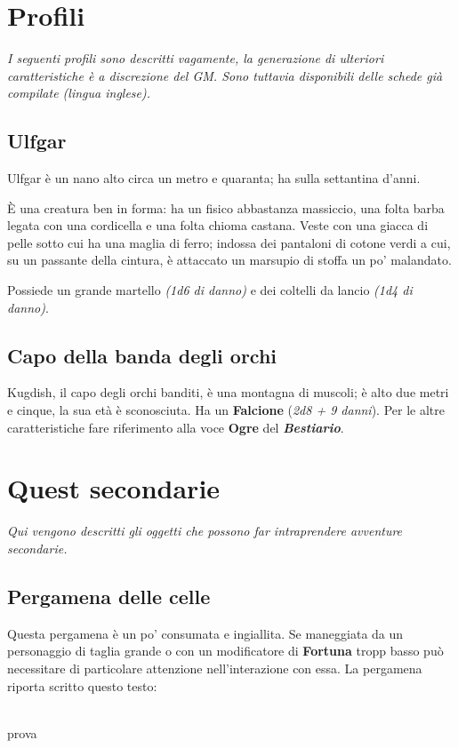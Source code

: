  		\section{Profili}
 			\textit{I seguenti profili sono descritti vagamente, la generazione di ulteriori caratteristiche è a discrezione del GM. Sono tuttavia disponibili delle schede già compilate (lingua inglese).}
 			\subsection{Ulfgar}
 				Ulfgar è un nano alto circa un metro e quaranta; ha sulla settantina d'anni.\par
 				È una creatura ben in forma: ha un fisico abbastanza massiccio, una folta barba legata con una cordicella e una folta chioma castana. Veste con una giacca di pelle sotto cui ha una maglia di ferro; indossa dei pantaloni di cotone verdi a cui, su un passante della cintura, è attaccato un marsupio di stoffa un po' malandato.\par
 				Possiede un grande martello \emph{(1d6 di danno)} e dei coltelli da lancio \emph{(1d4 di danno)}.\par
 			\subsection{Capo della banda degli orchi}
 				Kugdish, il capo degli orchi banditi, è una montagna di muscoli; è alto due metri e cinque, la sua età è sconosciuta. Ha un \textbf{Falcione} (\textit{2d8 + 9 danni}). Per le altre caratteristiche fare riferimento alla voce \textbf{Ogre} del \textit{\textbf{Bestiario}}.
 \newpage
 	\section{Quest secondarie}
 			\textit{Qui vengono descritti gli oggetti che possono far intraprendere avventure secondarie.}
 			\subsection{Pergamena delle celle}
 				Questa pergamena è un po' consumata e ingiallita. Se maneggiata da un personaggio di taglia grande o con un modificatore di  \textbf{Fortuna} tropp basso può necessitare di particolare attenzione nell'interazione con essa. La pergamena riporta scritto questo testo:\\\\
					\begin{center}
	 					{\LARGE {\Fontauri prova}}
	 				\end{center}